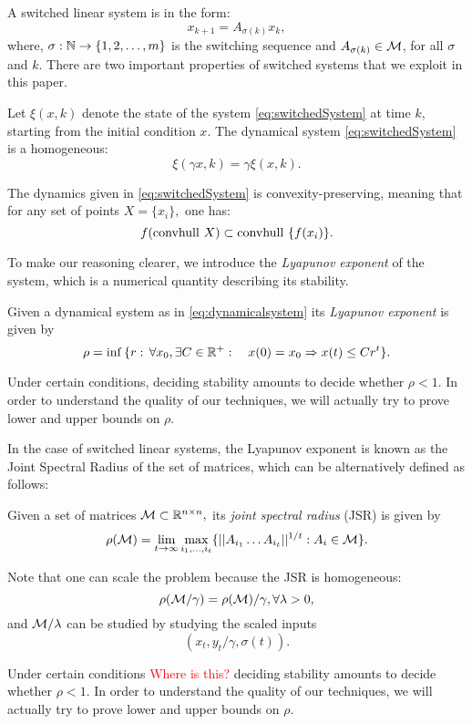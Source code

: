 A switched linear system is in the form:
\begin{equation}\label{eq:switchedSystem}x_{k+1} = A_{\sigma(k)}x_k,\end{equation}
where, $\sigma: \mathbb{N} \to \{1,2, \ldots, m\}$ is the switching sequence and $A_{\sigma(k)} \in \mathcal{M}$, for all $\sigma$ and $k$. There are two important properties of switched systems that we exploit in this paper.
\begin{property}\label{property:homogeneity}
Let $\xi(x, k)$ denote the state of the system \eqref{eq:switchedSystem} at time $k$, starting from the initial condition $x$. The dynamical system \eqref{eq:switchedSystem} is a homogeneous:
$$\xi(\gamma x, k)= \gamma \xi(x, k). $$
\end{property}
\begin{property}\label{property:convpres}
The dynamics given in \eqref{eq:switchedSystem} is convexity-preserving, meaning that for any set of points $X=\{x_i\},$ one has:
$$ f(\mbox{convhull }{X})\subset \mbox{convhull }\{f(x_i)\}. $$
\end{property}

To make our reasoning clearer, we introduce the \emph{Lyapunov exponent} of the system, which is a numerical quantity describing its stability.
\begin{definition}   Given a dynamical system as in \eqref{eq:dynamicalsystem} its \emph{Lyapunov exponent} is given by
$$\rho =\inf{\{r:\,\forall x_0, \exists C\in \mathbb{R}^+: \quad x(0)=x_0 \Rightarrow x(t)\leq Cr^t\}}. $$
\end{definition}
Under certain conditions, deciding stability amounts to decide whether $\rho<1.$  In order to understand the quality of our techniques, we will actually try to prove lower and upper bounds on $\rho.$ 

In the case of switched linear systems, the Lyapunov exponent is known as the Joint Spectral Radius of the set of matrices, which can be alternatively defined as follows:
\begin{definition} \cite{jungers_lncis} Given a set of matrices $\mathcal{M} \subset \mathbb{R}^{n\times n},$ its \emph{joint spectral radius} (JSR) is given by
$$\rho(\mathcal{M}) =\lim_{t\rightarrow \infty} \max_{i_1,\dots, i_t}\{||A_{i_1} \dots A_{i_t}||^{1/t}: A_i\in\mathcal{M}\}. $$
\end{definition}

\begin{remark}\label{rem:scaling}
 Note that one can scale the problem because the JSR is homogeneous:
$$\rho(\mathcal{M}/\gamma)=\rho(\mathcal{M})/\gamma, \forall \lambda>0, $$ and $\mathcal{M}/\lambda$ can be studied by studying the scaled inputs $$(x_t, y_t/\gamma,\sigma(t)).$$
\end{remark}

Under certain conditions \textcolor{red}{Where is this?} deciding stability amounts to decide whether $\rho<1.$  In order to understand the quality of our techniques, we will actually try to prove lower and upper bounds on $\rho.$ 